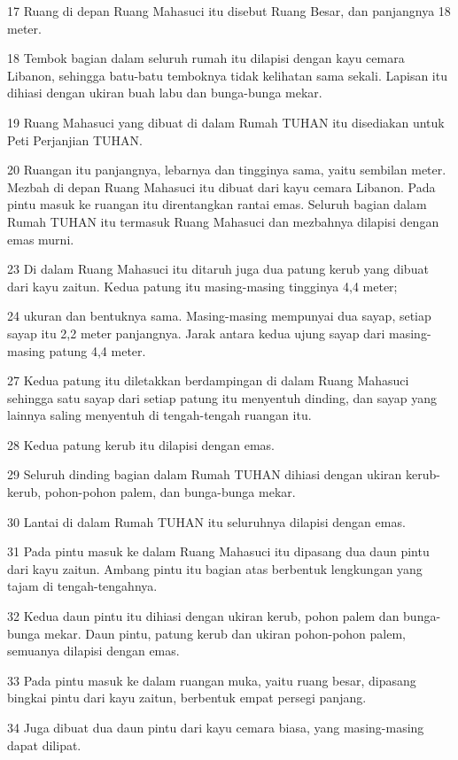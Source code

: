 \par 17 Ruang di depan Ruang Mahasuci itu disebut Ruang Besar, dan panjangnya 18 meter.
\par 18 Tembok bagian dalam seluruh rumah itu dilapisi dengan kayu cemara Libanon, sehingga batu-batu temboknya tidak kelihatan sama sekali. Lapisan itu dihiasi dengan ukiran buah labu dan bunga-bunga mekar.
\par 19 Ruang Mahasuci yang dibuat di dalam Rumah TUHAN itu disediakan untuk Peti Perjanjian TUHAN.
\par 20 Ruangan itu panjangnya, lebarnya dan tingginya sama, yaitu sembilan meter. Mezbah di depan Ruang Mahasuci itu dibuat dari kayu cemara Libanon. Pada pintu masuk ke ruangan itu direntangkan rantai emas. Seluruh bagian dalam Rumah TUHAN itu termasuk Ruang Mahasuci dan mezbahnya dilapisi dengan emas murni.
\par 23 Di dalam Ruang Mahasuci itu ditaruh juga dua patung kerub yang dibuat dari kayu zaitun. Kedua patung itu masing-masing tingginya 4,4 meter;
\par 24 ukuran dan bentuknya sama. Masing-masing mempunyai dua sayap, setiap sayap itu 2,2 meter panjangnya. Jarak antara kedua ujung sayap dari masing-masing patung 4,4 meter.
\par 27 Kedua patung itu diletakkan berdampingan di dalam Ruang Mahasuci sehingga satu sayap dari setiap patung itu menyentuh dinding, dan sayap yang lainnya saling menyentuh di tengah-tengah ruangan itu.
\par 28 Kedua patung kerub itu dilapisi dengan emas.
\par 29 Seluruh dinding bagian dalam Rumah TUHAN dihiasi dengan ukiran kerub-kerub, pohon-pohon palem, dan bunga-bunga mekar.
\par 30 Lantai di dalam Rumah TUHAN itu seluruhnya dilapisi dengan emas.
\par 31 Pada pintu masuk ke dalam Ruang Mahasuci itu dipasang dua daun pintu dari kayu zaitun. Ambang pintu itu bagian atas berbentuk lengkungan yang tajam di tengah-tengahnya.
\par 32 Kedua daun pintu itu dihiasi dengan ukiran kerub, pohon palem dan bunga-bunga mekar. Daun pintu, patung kerub dan ukiran pohon-pohon palem, semuanya dilapisi dengan emas.
\par 33 Pada pintu masuk ke dalam ruangan muka, yaitu ruang besar, dipasang bingkai pintu dari kayu zaitun, berbentuk empat persegi panjang.
\par 34 Juga dibuat dua daun pintu dari kayu cemara biasa, yang masing-masing dapat dilipat.
